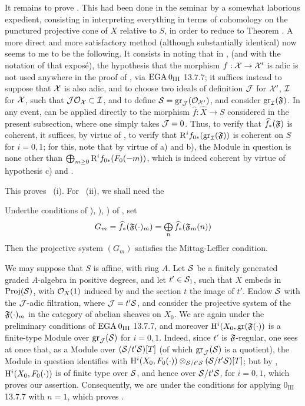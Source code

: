 It remains to prove . This had been done in the
seminar by a somewhat laborious expedient, consisting in interpreting
everything in terms of cohomology on the punctured projective cone
of $X$ relative to $S$, in order to reduce to
Theorem . A more direct and more
satisfactory method (although substantially identical) now seems to me
to be the following. It consists in noting that in ,
\numero {}\label{XII.14} (and with the
notation of that expos\'e), the hypothesis that the morphism
$f:\mathcal X\to\mathcal X'$ is adic is not used anywhere in the
proof of , via $\textup{EGA}\kern.2em 0_{\textup{III}}$ 13.7.7;
it suffices instead to suppose that $\mathcal X$ is also adic,
and to choose two ideals of definition $\mathcal J$ for $\mathcal X'$, $\mathcal I$
for $\mathcal X$, such that $\mathcal J\mathcal O_\mathcal X\subset\mathcal I$, and to define
$\mathcal S=\operatorname{gr}_\mathcal J(\mathcal O_{\mathcal X'})$, and consider $\operatorname{gr}_\mathcal I(\mathfrak F)$. In
any event,  can be applied directly to the
morphism $\widehat{f}:\widehat{X}\to S$ considered in the present
subsection, where one simply takes $\mathcal J=0$. Thus, to verify that
$\widehat{f}_\ast(\mathfrak F)$ is coherent, it suffices, by virtue of
\loccit, to verify that $\mathrm R^if_{0\ast}(\operatorname{gr}_\mathcal I(\mathfrak F))$ is
coherent on $S$ for $i=0, 1$; for this, note that by virtue of
a) and b), the Module in question is none other than
$\bigoplus_{m\geq 0}\mathrm R^if_{0\ast}(F_0(-m))$, which
is indeed coherent by virtue of hypothesis c) and
.

This proves ~(i). For ~(ii), we shall need the

\begin{lemme} \label{XII.3.3}
Under\pageoriginaled the conditions of ), ), ) of , set
\[
G_m= \widehat{f}_\ast(\mathfrak F(\cdot)_m) = \mathop{\textstyle\bigoplus}\limits_n\widehat{f}_\ast(\mathfrak F_m(n))
\]
Then the projective system $(G_m)$ satisfies the Mittag-Leffler condition.
\end{lemme}

We may suppose that $S$ is affine, with ring $A$. Let $\mathcal S$ be a finitely generated graded $A$-algebra in positive degrees, and let $t'\in\mathcal S_1$, such that $X$ embeds in $\operatorname{Proj}(\mathcal S)$, with $\mathcal O_X(1)$ induced by  and the section $t$ the image of $t'$. Endow $\mathcal S$ with the $\mathcal J$-adic filtration, where $\mathcal J=t'\mathcal S$, and consider the projective system of the $\mathfrak F(\cdot)_m$ in the category of abelian sheaves on $X_0$. We are again under the preliminary conditions of $\textup{EGA}\kern.2em 0_{\textup{III}}$ 13.7.7, and moreover $\mathrm H^i(X_0, \operatorname{gr}(\mathfrak F(\cdot))$ is a finite-type Module over $\operatorname{gr}_\mathcal J(\mathcal S)$ for $i=0, 1$. Indeed, since $t'$ is $\mathfrak F$-regular, one sees at once that, as a Module over $(\mathcal S /t'\mathcal S)[T]$ (of which $\operatorname{gr}_\mathcal J(\mathcal S)$ is a quotient), the Module in question identifies with $\mathrm H^i(X_0, F_0(\cdot))\otimes_{\mathcal S /t'\mathcal S}(\mathcal S /t'\mathcal S)[T]$; but by , $\mathrm H^i(X_0, F_0(\cdot))$ is of finite type over $\mathcal S$, and hence over $\mathcal S /t'\mathcal S$, for $i=0, 1$, which proves our assertion. Consequently, we are under the conditions for applying $0_{\text{III}}$ 13.7.7 with $n=1$, which proves .

